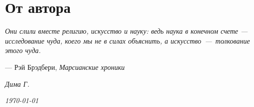 \sloppy
\chapter*{От автора}

\epigraph{\itshape Они слили вместе религию, искусство и науку: ведь наука в конечном счете --- исследование чуда, коего мы не в силах объяснить, а искусство~---~толкование этого чуда.}{--- Рэй Брэдбери, \textit{Марсианские хроники}}

\begin{flushright}
\textit{Дима Г.}

\textit{\today}
\end{flushright}